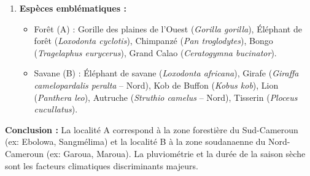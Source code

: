 \documentclass[11pt]{article}
\begin{document}
\begin{exoresolu}
\begin{enumerate}
\begin{itemize}
                  \item \textit{Végétales :} Canopée fermée (strates superposées, fort LAI) limitant la lumière au sol ; feuilles mésophylles persistantes (adaptation à l'humidité constante, pas de stress hydrique).
              \end{itemize}
              \textbf{Justification Localité B (Savane) :}
              \begin{itemize}
                  \item \textit{Climatiques :} Pluviométrie modérée ($\SI{950}{mm}$) et saison sèche longue ($\SI{6}{mois}$) : stress hydrique marqué sélectionnant des espèces xérophiles.
                  \item \textit{Végétales :} Arbres à écorce épaisse (protection feu/feu) et feuilles caduques microphylles (réduction transpiration en saison sèche) ; strate herbacée continue dominée par des graminées pérennes (Andropogon) adaptées au feu.
              \end{itemize}
        \item \textbf{Espèces emblématiques :}
              \begin{itemize}
                  \item Forêt (A) : Gorille des plaines de l'Ouest (\emph{Gorilla gorilla}), Éléphant de forêt (\emph{Loxodonta cyclotis}), Chimpanzé (\emph{Pan troglodytes}), Bongo (\emph{Tragelaphus eurycerus}), Grand Calao (\emph{Ceratogymna bucinator}).
                  \item Savane (B) : Éléphant de savane (\emph{Loxodonta africana}), Girafe (\emph{Giraffa camelopardalis peralta} -- Nord), Kob de Buffon (\emph{Kobus kob}), Lion (\emph{Panthera leo}), Autruche (\emph{Struthio camelus} -- Nord), Tisserin (\emph{Ploceus cucullatus}).
              \end{itemize}
    \end{enumerate}
    \textbf{Conclusion :} La localité A correspond à la zone forestière du Sud-Cameroun (ex: Ebolowa, Sangmélima) et la localité B à la zone soudanaenne du Nord-Cameroun (ex: Garoua, Maroua). La pluviométrie et la durée de la saison sèche sont les facteurs climatiques discriminants majeurs.
\end{exoresolu}
\end{document}
